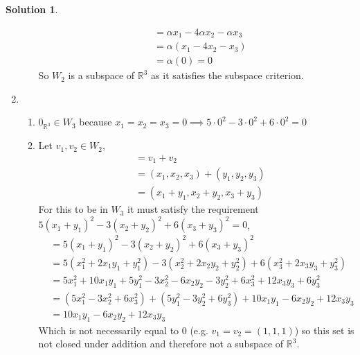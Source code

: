 \documentclass[10pt]{article}
\theoremstyle{definition}
\newtheorem{soln}{Solution}
\begin{document}
\begin{soln}
\begin{enumerate}[label=(\alph*)]
\begin{enumerate}[label=(\roman*)]
\begin{align*}
                     & = \alpha x_1-4\alpha x_2-\alpha x_3 \\
                     & = \alpha(x_1-4 x_2- x_3)            \\
                     & = \alpha(0)=0
                  \end{align*}
                  So $W_2$ is a subspace of $\mathbb{R}^3$ as it satisfies the subspace criterion.
          \end{enumerate}
    \item \begin{enumerate}[label=(\roman*)]
            \item $0_{\mathbb{R}^3}\in W_3$ because $x_1=x_2=x_3=0\implies 5\cdot0^2-3\cdot0^2+6\cdot0^2=0$
            \item Let $v_1,v_2\in W_2$,
                  \begin{align*}
                     & = v_1+v_2                     \\
                     & = (x_1,x_2,x_3)+(y_1,y_2,y_3) \\
                     & = (x_1+y_1,x_2+y_2,x_3+y_3)
                  \end{align*}
                  For this to be in $W_3$ it must satisfy the requirement $5(x_1+y_1)^2-3(x_2+y_2)^2+6(x_3+y_3)^2=0$,
                  \begin{align*}
                     & = 5(x_1+y_1)^2-3(x_2+y_2)^2+6(x_3+y_3)^2                                  \\
                     & = 5(x_1^2+2x_1y_1+y_1^2)-3(x_2^2+2x_2y_2+y_2^2)+6(x_3^2+2x_3y_3+y_3^2)    \\
                     & = 5x_1^2+10x_1y_1+5y_1^2-3x_2^2-6x_2y_2-3y_2^2+6x_3^2+12x_3y_3+6y_3^2     \\
                     & = (5x_1^2-3x_2^2+6x_3^2)+(5y_1^2-3y_2^2+6y_3^2)+10x_1y_1-6x_2y_2+12x_3y_3 \\
                     & = 10x_1y_1-6x_2y_2+12x_3y_3 
                  \end{align*}
                  Which is not necessarily equal to 0 (e.g. $v_1=v_2=(1,1,1)$) so this set is not closed under addition and therefore not a subspace of $\mathbb{R}^3$.
          \end{enumerate}
  \end{enumerate}
\end{soln}
\end{document}
